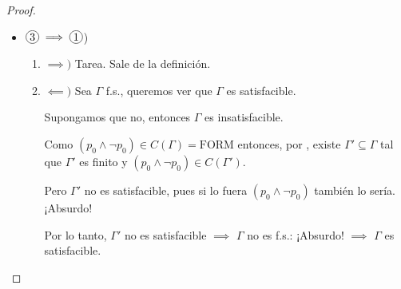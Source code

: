 \begin{proof}
\begin{itemize}





        \item $\circled{3} \implies \circled{1}$) 
            \begin{enumerate}[%
                            labelindent=*,
                            style=multiline,
                            leftmargin=*,
                            align=left,
                            leftmargin=2\parindent,
                            label=Caso \arabic*)]
                \item $\implies)$ Tarea. Sale de la definición.
                \item $\impliedby)$ Sea $\Gamma$ f.s., queremos ver que
                    $\Gamma$ es satisfacible.

                    Supongamos que no, entonces $\Gamma$ es insatisfacible.

                    Como $(p_0 \wedge \neg p_0) \in C(\Gamma) = \mathrm{FORM}$
                    entonces, por , existe 
                    $\Gamma' \subseteq \Gamma$ tal que $\Gamma'$ es finito
                    y $(p_0 \wedge \neg p_0) \in C(\Gamma')$.

                    Pero $\Gamma'$ no es satisfacible, pues si lo fuera
                    $(p_0 \wedge \neg p_0)$ también lo sería. ¡Absurdo!

                    Por lo tanto, $\Gamma'$ no es satisfacible $\implies$
                    $\Gamma$ no es f.s.: ¡Absurdo! $\implies$ $\Gamma$ es
                    satisfacible.
            \end{enumerate}
    \end{itemize}
\end{proof}

